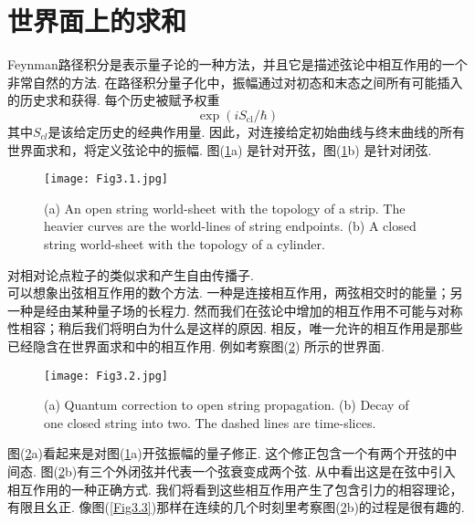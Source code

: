 \section{世界面上的求和}
Feynman路径积分是表示量子论的一种方法，并且它是描述弦论中相互作用的一个非常自然的方法. 在路径积分量子化中，振幅通过对初态和末态之间所有可能插入的历史求和获得. 每个历史被赋予权重
\begin{equation}
	\exp \left(i S_{\mathrm{cl}} / \hbar\right)
\end{equation}
其中$S_{cl}$是该给定历史的经典作用量. 因此，对连接给定初始曲线与终末曲线的所有世界面求和，将定义弦论中的振幅. 图(\ref{Fig3.1}a) 是针对开弦，图(\ref{Fig3.1}b) 是针对闭弦.\\
\begin{figure}
	\begin{center}
		\texttt{[image: Fig3.1.jpg]}\\
\caption{(a) An open string world-sheet with the topology of a strip. The heavier curves are the world-lines of string endpoints. (b) A closed string world-sheet with the topology of a cylinder.}\label{Fig3.1}
	\end{center}
\end{figure}
对相对论点粒子的类似求和产生自由传播子.\\
可以想象出弦相互作用的数个方法. 一种是连接相互作用，两弦相交时的能量；另一种是经由某种量子场的长程力. 然而我们在弦论中增加的相互作用不可能与对称性相容；稍后我们将明白为什么是这样的原因. 相反，唯一允许的相互作用是那些已经隐含在世界面求和中的相互作用. 例如考察图(\ref{Fig3.2}) 所示的世界面.\\
\begin{figure}
	\begin{center}
		\texttt{[image: Fig3.2.jpg]}\\
\caption{(a) Quantum correction to open string propagation. (b) Decay of one closed string into two. The dashed lines are time-slices.}\label{Fig3.2}
	\end{center}
\end{figure}
图(\ref{Fig3.2}a)看起来是对图(\ref{Fig3.1}a)开弦振幅的量子修正. 这个修正包含一个有两个开弦的中间态. 图(\ref{Fig3.2}b)有三个外闭弦并代表一个弦衰变成两个弦. 从中看出这是在弦中引入相互作用的一种正确方式. 我们将看到这些相互作用产生了包含引力的相容理论，有限且幺正.
像图(\ref{Fig3.3})那样在连续的几个时刻里考察图(\ref{Fig3.2}b)的过程是很有趣的.\\
